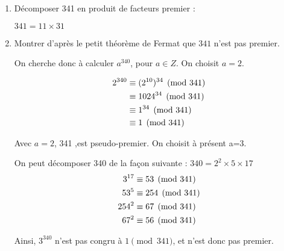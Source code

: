 \documentclass[a4paper,10pt]{article}
\begin{document}
	\begin{enumerate}
	\item
	Décomposer 341 en produit de facteurs premier :
	
	$341=11 \times 31$
	\item
	Montrer d'après le petit théorème de Fermat que $341$ n'est pas  premier.
	
	On cherche donc à calculer $a^{340}$, pour $a \in Z$.	
	On choisit $a=2$.
	
	\begin{align}
		2^{340} &\equiv (2^{10})^{34} \pmod{341}\notag \\
			  &\equiv 1024^{34} \pmod{341}\notag \\
			  &\equiv 1^{34} \pmod{341}\notag \\
			  &\equiv 1\pmod{341}\notag
	\end{align}
	
	Avec $a=2$, 341 ,est pseudo-premier. On choisit à présent a=3.
	
	On peut décomposer 340 de la façon suivante : $340 = 2^2\times 5\times 17$ 
	\begin{align}	
		3^{17} &\equiv 53 \pmod{341}\notag \\
			53^5  &\equiv 254 \pmod{341}\notag \\
			 254^2 &\equiv 67 \pmod{341}\notag \\
			 67^2 &\equiv 56\pmod{341}\notag
	\end{align}
	
	Ainsi, $3^{340}$ n'est pas congru à $ 1 \pmod{341}$, et n'est donc pas premier.
	\end{enumerate}
		
	 
\end{document}
